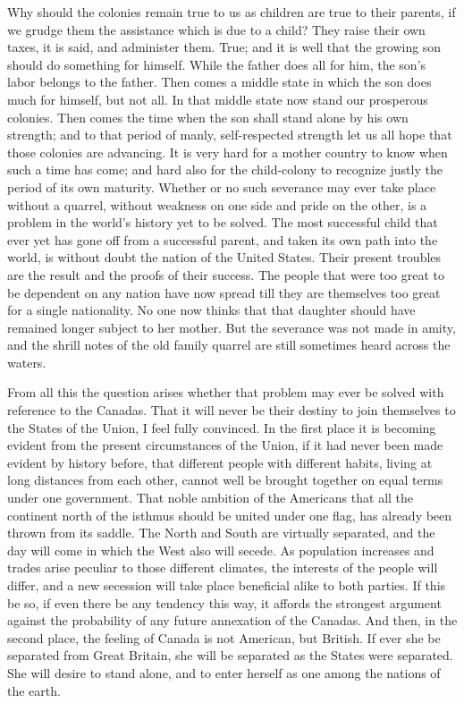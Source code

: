 Why should the colonies remain true to us as children are true to
their parents, if we grudge them the assistance which is due to a
child?  They raise their own taxes, it is said, and administer
them.  True; and it is well that the growing son should do
something for himself.  While the father does all for him, the
son's labor belongs to the father.  Then comes a middle state in
which the son does much for himself, but not all.  In that middle
state now stand our prosperous colonies.  Then comes the time when
the son shall stand alone by his own strength; and to that period
of manly, self-respected strength let us all hope that those
colonies are advancing.  It is very hard for a mother country to
know when such a time has come; and hard also for the child-colony
to recognize justly the period of its own maturity.  Whether or no
such severance may ever take place without a quarrel, without
weakness on one side and pride on the other, is a problem in the
world's history yet to be solved.  The most successful child that
ever yet has gone off from a successful parent, and taken its own
path into the world, is without doubt the nation of the United
States.  Their present troubles are the result and the proofs of
their success.  The people that were too great to be dependent on
any nation have now spread till they are themselves too great for a
single nationality.  No one now thinks that that daughter should
have remained longer subject to her mother.  But the severance was
not made in amity, and the shrill notes of the old family quarrel
are still sometimes heard across the waters.

From all this the question arises whether that problem may ever be
solved with reference to the Canadas.  That it will never be their
destiny to join themselves to the States of the Union, I feel fully
convinced.  In the first place it is becoming evident from the
present circumstances of the Union, if it had never been made
evident by history before, that different people with different
habits, living at long distances from each other, cannot well be
brought together on equal terms under one government.  That noble
ambition of the Americans that all the continent north of the
isthmus should be united under one flag, has already been thrown
from its saddle.  The North and South are virtually separated, and
the day will come in which the West also will secede.  As
population increases and trades arise peculiar to those different
climates, the interests of the people will differ, and a new
secession will take place beneficial alike to both parties.  If
this be so, if even there be any tendency this way, it affords the
strongest argument against the probability of any future annexation
of the Canadas.  And then, in the second place, the feeling of
Canada is not American, but British.  If ever she be separated from
Great Britain, she will be separated as the States were separated.
She will desire to stand alone, and to enter herself as one among
the nations of the earth.

